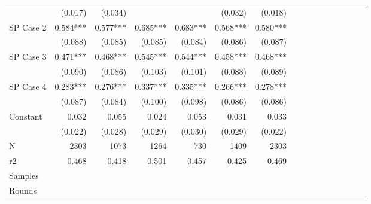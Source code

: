 \begin{tabular}{@{\extracolsep{5pt}}lrrrrrrrrrrrrrrr}
& (0.017)\phantom{***} & (0.034)\phantom{***} & \phantom{***} & \phantom{***} & (0.032)\phantom{***} & (0.018)\phantom{***} \\
SP Case 2 & 0.584\phantom{)}*** & 0.577\phantom{)}*** & 0.685\phantom{)}*** & 0.683\phantom{)}*** & 0.568\phantom{)}*** & 0.580\phantom{)}*** \\
& (0.088)\phantom{***} & (0.085)\phantom{***} & (0.085)\phantom{***} & (0.084)\phantom{***} & (0.086)\phantom{***} & (0.087)\phantom{***} \\
SP Case 3 & 0.471\phantom{)}*** & 0.468\phantom{)}*** & 0.545\phantom{)}*** & 0.544\phantom{)}*** & 0.458\phantom{)}*** & 0.468\phantom{)}*** \\
& (0.090)\phantom{***} & (0.086)\phantom{***} & (0.103)\phantom{***} & (0.101)\phantom{***} & (0.088)\phantom{***} & (0.089)\phantom{***} \\
SP Case 4 & 0.283\phantom{)}*** & 0.276\phantom{)}*** & 0.337\phantom{)}*** & 0.335\phantom{)}*** & 0.266\phantom{)}*** & 0.278\phantom{)}*** \\
& (0.087)\phantom{***} & (0.084)\phantom{***} & (0.100)\phantom{***} & (0.098)\phantom{***} & (0.086)\phantom{***} & (0.086)\phantom{***} \\
Constant & 0.032\phantom{\phantom{)}***} & 0.055\phantom{\phantom{)}***} & 0.024\phantom{\phantom{)}***} & 0.053\phantom{\phantom{)}***} & 0.031\phantom{\phantom{)}***} & 0.033\phantom{\phantom{)}***} \\
& (0.022)\phantom{***} & (0.028)\phantom{***} & (0.029)\phantom{***} & (0.030)\phantom{***} & (0.029)\phantom{***} & (0.022)\phantom{***} \\
\hline
N & 2303\phantom{***} & 1073\phantom{***} & 1264\phantom{***} & 730\phantom{***} & 1409\phantom{***} & 2303\phantom{***} \\
r2 & 0.468\phantom{***} & 0.418\phantom{***} & 0.501\phantom{***} & 0.457\phantom{***} & 0.425\phantom{***} & 0.469\phantom{***} \\
{Samples}} & \multicolumn{1}{p{0.13\linewidth}}{\centering{All}} & \multicolumn{1}{p{0.13\linewidth}}{\centering{1a}} & \multicolumn{1}{p{0.13\linewidth}}{\centering{1a 2a 3}} & \multicolumn{1}{p{0.13\linewidth}}{\centering{1a}} & \multicolumn{1}{p{0.13\linewidth}}{\centering{All ex. 4}} & \multicolumn{1}{p{0.13\linewidth}}{\centering{All}} \\
{Rounds}} & \multicolumn{1}{p{0.13\linewidth}}{\centering{All}} & \multicolumn{1}{p{0.13\linewidth}}{\centering{All}} & \multicolumn{1}{p{0.13\linewidth}}{\centering{1 2}} & \multicolumn{1}{p{0.13\linewidth}}{\centering{1 2}} & \multicolumn{1}{p{0.13\linewidth}}{\centering{All}} & \multicolumn{1}{p{0.13\linewidth}}{\centering{All}} \\

\end{tabular}
